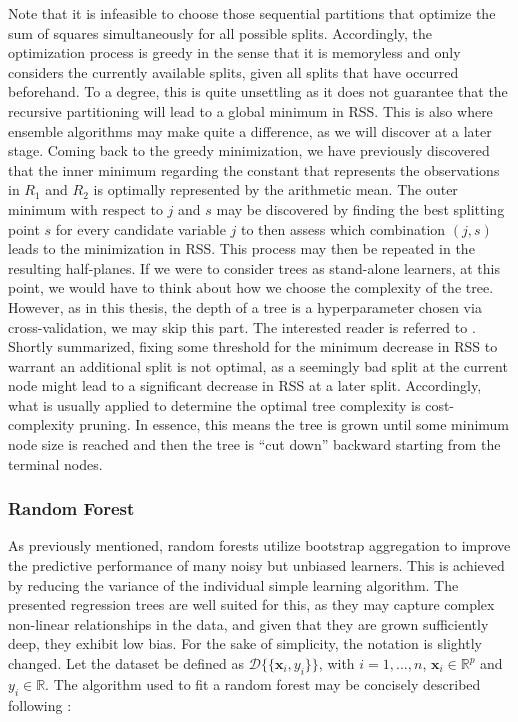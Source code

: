 \documentclass[a4paper,12pt, headsepline]{scrartcl}
\numberwithin{equation}{section}
\begin{document}
Note that it is infeasible to choose those sequential partitions that optimize the sum of squares simultaneously for all possible splits. Accordingly, the optimization process is greedy in the sense that it is memoryless and only considers the currently available splits, given all splits that have occurred beforehand. To a degree, this is quite unsettling as it does not guarantee that the recursive partitioning will lead to a global minimum in RSS. This is also where ensemble algorithms may make quite a difference, as we will discover at a later stage. Coming back to the greedy minimization, we have previously discovered that the inner minimum regarding the constant that represents the observations in $R_1$ and $R_2$ is optimally represented by the arithmetic mean. The outer minimum with respect to $j$ and $s$ may be discovered by finding the best splitting point $s$ for every candidate variable $j$ to then assess which combination $(j, s)$ leads to the minimization in RSS. This process may then be repeated in the resulting half-planes. If we were to consider trees as stand-alone learners, at this point, we would have to think about how we choose the complexity of the tree. However, as in this thesis, the depth of a tree is a hyperparameter chosen via cross-validation, we may skip this part. The interested reader is referred to \citet{hastie09}. Shortly summarized, fixing some threshold for the minimum decrease in RSS to warrant an additional split is not optimal, as a seemingly bad split at the current node might lead to a significant decrease in RSS at a later split. Accordingly, what is usually applied to determine the optimal tree complexity is cost-complexity pruning. In essence, this means the tree is grown until some minimum node size is reached and then the tree is \enquote{cut down} backward starting from the terminal nodes.

\subsubsection{Random Forest}\label{subsubsec:rf}
As previously mentioned, random forests utilize bootstrap aggregation to improve the predictive performance of many noisy but unbiased learners. This is achieved by reducing the variance of the individual simple learning algorithm. The presented regression trees are well suited for this, as they may capture complex non-linear relationships in the data, and given that they are grown sufficiently deep, they exhibit low bias. For the sake of simplicity, the notation is slightly changed. Let the dataset be defined as $\mathcal{D}\{\{\bm x_i, y_i\}\}$, with $i = 1, ..., n$, $\bm x_i \in \mathbb{R}^p$ and $y_i \in \mathbb{R}$. The algorithm used to fit a random forest may be concisely described following \citet{hastie09}:
\end{document}
